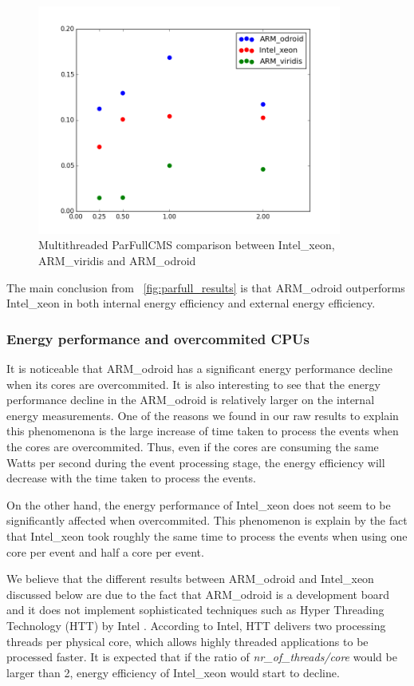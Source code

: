 \begin{figure}[h]
  \centering
    \includegraphics[width=100mm]{"img/aalto/parfull_results_aalto"}
    \caption{Multithreaded ParFullCMS comparison between Intel\_xeon, ARM\_viridis and ARM\_odroid}
    \label{fig:parfull_results_aalto}
\end{figure}

The main conclusion from ~\ref{fig:parfull_results} is that ARM\_odroid outperforms Intel\_xeon in both internal energy efficiency and external energy efficiency.

\subsubsection*{Energy performance and overcommited CPUs}

It is noticeable that ARM\_odroid has a significant energy performance decline when its cores are overcommited. It is also interesting to see that the energy performance decline in the ARM\_odroid is relatively larger on the internal energy measurements. One of the reasons we found in our raw results to explain this phenomenona is the large increase of time taken to process the events when the cores are overcommited. Thus, even if the cores are consuming the same Watts per second during the event processing stage, the energy efficiency will decrease with the time taken to process the events.  

On the other hand, the energy performance of Intel\_xeon does not seem to be significantly affected when overcommited. This phenomenon is explain by the fact that Intel\_xeon took roughly the same time to process the events when using one core per event and half a core per event.

We believe that the different results between ARM\_odroid and Intel\_xeon discussed below are due to the fact that ARM\_odroid is a development board and it does not implement sophisticated techniques such as Hyper Threading Technology (HTT) by Intel \cite{HTT}. According to Intel, HTT delivers two processing threads per physical core, which allows highly threaded applications to be processed faster. It is expected that if the ratio of  \textit{nr\_of\_threads/core} would be larger than 2, energy efficiency of Intel\_xeon would start to decline.  

